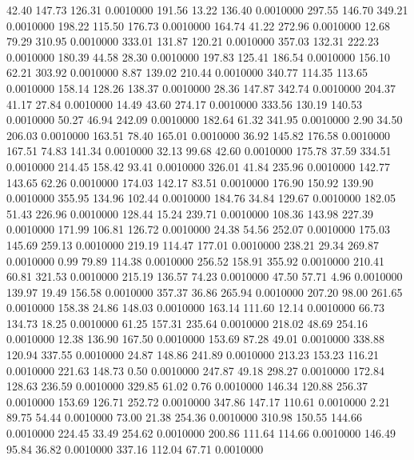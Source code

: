   42.40  147.73  126.31   0.0010000
 191.56   13.22  136.40   0.0010000
 297.55  146.70  349.21   0.0010000
 198.22  115.50  176.73   0.0010000
 164.74   41.22  272.96   0.0010000
  12.68   79.29  310.95   0.0010000
 333.01  131.87  120.21   0.0010000
 357.03  132.31  222.23   0.0010000
 180.39   44.58   28.30   0.0010000
 197.83  125.41  186.54   0.0010000
 156.10   62.21  303.92   0.0010000
   8.87  139.02  210.44   0.0010000
 340.77  114.35  113.65   0.0010000
 158.14  128.26  138.37   0.0010000
  28.36  147.87  342.74   0.0010000
 204.37   41.17   27.84   0.0010000
  14.49   43.60  274.17   0.0010000
 333.56  130.19  140.53   0.0010000
  50.27   46.94  242.09   0.0010000
 182.64   61.32  341.95   0.0010000
   2.90   34.50  206.03   0.0010000
 163.51   78.40  165.01   0.0010000
  36.92  145.82  176.58   0.0010000
 167.51   74.83  141.34   0.0010000
  32.13   99.68   42.60   0.0010000
 175.78   37.59  334.51   0.0010000
 214.45  158.42   93.41   0.0010000
 326.01   41.84  235.96   0.0010000
 142.77  143.65   62.26   0.0010000
 174.03  142.17   83.51   0.0010000
 176.90  150.92  139.90   0.0010000
 355.95  134.96  102.44   0.0010000
 184.76   34.84  129.67   0.0010000
 182.05   51.43  226.96   0.0010000
 128.44   15.24  239.71   0.0010000
 108.36  143.98  227.39   0.0010000
 171.99  106.81  126.72   0.0010000
  24.38   54.56  252.07   0.0010000
 175.03  145.69  259.13   0.0010000
 219.19  114.47  177.01   0.0010000
 238.21   29.34  269.87   0.0010000
   0.99   79.89  114.38   0.0010000
 256.52  158.91  355.92   0.0010000
 210.41   60.81  321.53   0.0010000
 215.19  136.57   74.23   0.0010000
  47.50   57.71    4.96   0.0010000
 139.97   19.49  156.58   0.0010000
 357.37   36.86  265.94   0.0010000
 207.20   98.00  261.65   0.0010000
 158.38   24.86  148.03   0.0010000
 163.14  111.60   12.14   0.0010000
  66.73  134.73   18.25   0.0010000
  61.25  157.31  235.64   0.0010000
 218.02   48.69  254.16   0.0010000
  12.38  136.90  167.50   0.0010000
 153.69   87.28   49.01   0.0010000
 338.88  120.94  337.55   0.0010000
  24.87  148.86  241.89   0.0010000
 213.23  153.23  116.21   0.0010000
 221.63  148.73    0.50   0.0010000
 247.87   49.18  298.27   0.0010000
 172.84  128.63  236.59   0.0010000
 329.85   61.02    0.76   0.0010000
 146.34  120.88  256.37   0.0010000
 153.69  126.71  252.72   0.0010000
 347.86  147.17  110.61   0.0010000
   2.21   89.75   54.44   0.0010000
  73.00   21.38  254.36   0.0010000
 310.98  150.55  144.66   0.0010000
 224.45   33.49  254.62   0.0010000
 200.86  111.64  114.66   0.0010000
 146.49   95.84   36.82   0.0010000
 337.16  112.04   67.71   0.0010000
